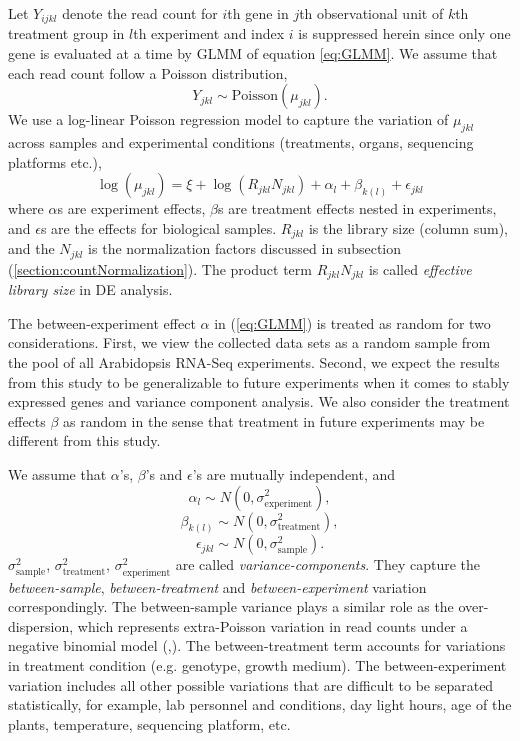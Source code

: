 \documentclass[11pt, a4paper]{article}
\begin{document}
Let $Y_{ijkl}$ denote the read count for $i$th gene
in $j$th observational unit of $k$th treatment group in $l$th experiment
and index $i$ is suppressed herein since only one gene is evaluated at a time
by GLMM of  equation \ref{eq:GLMM}. We assume that each read count follow a Poisson
distribution,  
\[Y_{jkl}\sim \text{Poisson}(\mu_{jkl}).\] 
We use a log-linear Poisson regression model to capture 
the variation of $\mu_{jkl}$ across samples and experimental conditions (treatments,
organs, sequencing platforms etc.),
\begin{equation}\label{eq:GLMM}
    \log( \mu_{jkl}) = \xi + \log(R_{jkl}N_{jkl})+ \alpha_l + \beta_{k(l)} + \epsilon_{jkl} 
\end{equation}
where $\alpha$s are experiment effects,  $\beta$s are treatment effects
nested in experiments, and $\epsilon$s are the effects for biological samples. 
$R_{jkl}$ is the library size (column sum), and the $N_{jkl}$ is the normalization factors discussed in
subsection (\ref{section:countNormalization}). The product term $R_{jkl}N_{jkl}$ is called \textit{effective library size} in DE analysis. 

The between-experiment effect $\alpha$ in (\ref{eq:GLMM}) is treated as random for two considerations. First, we view the collected data sets as a random sample from the pool of all Arabidopsis RNA-Seq experiments. Second, we expect the results from this study to be generalizable to future experiments when it comes to stably expressed genes and variance component analysis.
We also consider the treatment effects $\beta$ as random 
in the sense that treatment in future experiments may be different from this study.

We assume that $\alpha$'s, $\beta$'s and $\epsilon$'s are mutually independent, and  
  \[\alpha_l\sim N(0, \sigma^2_{\text{experiment}}),\] 
  \[\beta_{k(l)}\sim N(0, \sigma^2_{\text{treatment}}),\]
   \[\epsilon_{jkl}\sim N(0, \sigma_{\text{sample}}^2).\]
$\sigma_{\text{sample}}^2$, $\sigma_{\text{treatment}}^2$, $\sigma_{\text{experiment}}^2$ are called \textit{variance-components}. They capture the
\textit{between-sample}, \textit{between-treatment} and \textit{between-experiment} variation
correspondingly. The between-sample variance plays a similar role as the over-dispersion, which represents extra-Poisson variation in read counts under a negative binomial model (\cite{anders2010differential},\cite{di2011nbp}).  The between-treatment term accounts for variations in treatment condition (e.g. genotype, growth medium). 
The between-experiment variation includes all other possible variations that are difficult to be separated statistically, for example, lab personnel and conditions, day light hours, age of the plants, temperature, sequencing platform, etc.
\end{document}
